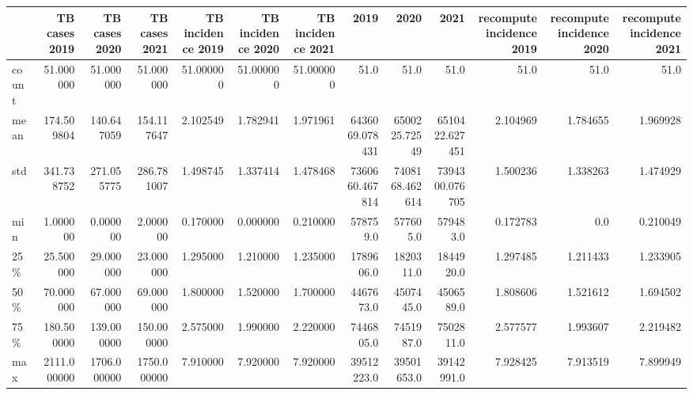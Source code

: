 \documentclass[
  letterpaper,
  DIV=11,
  numbers=noendperiod]{scrreprt}
\begin{document}
\begin{tabular}{lrrrrrrrrrrrr}
\toprule
{} &  TB cases 2019 &  TB cases 2020 &  TB cases 2021 &  TB incidence 2019 &  TB incidence 2020 &  TB incidence 2021 &            2019 &            2020 &            2021 &  recompute incidence 2019 &  recompute incidence 2020 &  recompute incidence 2021 \\
\midrule
count &      51.000000 &      51.000000 &      51.000000 &          51.000000 &          51.000000 &          51.000000 &            51.0 &            51.0 &            51.0 &                      51.0 &                      51.0 &                      51.0 \\
mean  &     174.509804 &     140.647059 &     154.117647 &           2.102549 &           1.782941 &           1.971961 &  6436069.078431 &   6500225.72549 &  6510422.627451 &                  2.104969 &                  1.784655 &                  1.969928 \\
std   &     341.738752 &     271.055775 &     286.781007 &           1.498745 &           1.337414 &           1.478468 &  7360660.467814 &  7408168.462614 &  7394300.076705 &                  1.500236 &                  1.338263 &                  1.474929 \\
min   &       1.000000 &       0.000000 &       2.000000 &           0.170000 &           0.000000 &           0.210000 &        578759.0 &        577605.0 &        579483.0 &                  0.172783 &                       0.0 &                  0.210049 \\
25\%   &      25.500000 &      29.000000 &      23.000000 &           1.295000 &           1.210000 &           1.235000 &       1789606.0 &       1820311.0 &       1844920.0 &                  1.297485 &                  1.211433 &                  1.233905 \\
50\%   &      70.000000 &      67.000000 &      69.000000 &           1.800000 &           1.520000 &           1.700000 &       4467673.0 &       4507445.0 &       4506589.0 &                  1.808606 &                  1.521612 &                  1.694502 \\
75\%   &     180.500000 &     139.000000 &     150.000000 &           2.575000 &           1.990000 &           2.220000 &       7446805.0 &       7451987.0 &       7502811.0 &                  2.577577 &                  1.993607 &                  2.219482 \\
max   &    2111.000000 &    1706.000000 &    1750.000000 &           7.910000 &           7.920000 &           7.920000 &      39512223.0 &      39501653.0 &      39142991.0 &                  7.928425 &                  7.913519 &                  7.899949 \\
\bottomrule
\end{tabular}
\end{document}
